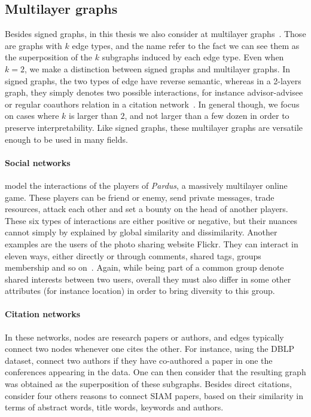 

\subsection{Multilayer graphs}
\label{sub:intro_multilayer_graphs}

Besides signed graphs, in this thesis we also consider at multilayer
graphs~\autocites{Kivela2014}{multiSurvey14}. Those are graphs with $k$ edge types, and the name
refer to the fact we can see them as the superposition of the $k$ subgraphs induced by each edge
type. Even when $k=2$, we make a distinction between signed graphs and multilayer graphs. In signed
graphs, the two types of edge have reverse semantic, whereas in a 2-layers graph, they simply
denotes two possible interactions, for instance advisor-advisee or regular coauthors relation in a
citation network~\autocite{Advisor10}. In general though, we focus on cases where $k$ is larger than
$2$, and not larger than a few dozen in order to preserve interpretability.
Like signed graphs, these multilayer graphs are versatile enough to be used in many fields.

\paragraph{Social networks} \Textcite{Szell2010} model the interactions of the players of
\emph{Pardus}, a massively multilayer online game. These players can be friend or enemy, send
private messages, trade resources, attack each other and set a bounty on the head of another
players. These six types of interactions are either positive or negative, but their nuances cannot
simply by explained by global similarity and dissimilarity. Another examples are the users of the
photo sharing website Flickr.  They can interact in eleven ways, either directly or through
comments, shared tags, groups membership and so on~\autocite{RecoFlickrMulti11}. Again, while being
part of a common group denote shared interests between two users, overall they must also differ in
some other attributes (for instance location) in order to bring diversity to this group.

\paragraph{Citation networks} In these networks, nodes are research papers or authors, and edges
typically connect two nodes whenever one cites the other. For instance, using the DBLP dataset,
\textcite{communityDBLPbyConf05} connect two authors if they have co-authored a paper in one the
 conferences appearing in the data. One can then consider that the resulting graph was
obtained as the superposition of these  subgraphs. Besides direct citations,
\textcite{articlesMultiSim11} consider four others reasons to connect  SIAM papers, based
on their similarity in terms of abstract words, title words, keywords and authors.

